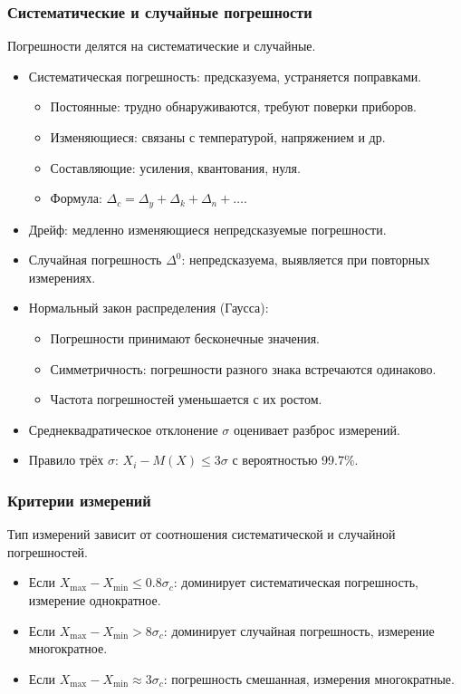 	\subsubsection{Систематические и случайные погрешности}
	Погрешности делятся на систематические и случайные.
	\begin{itemize}
		\item Систематическая погрешность: предсказуема, устраняется поправками.
		\begin{itemize}
			\item Постоянные: трудно обнаруживаются, требуют поверки приборов.
			\item Изменяющиеся: связаны с температурой, напряжением и др.
			\item Составляющие: усиления, квантования, нуля.
			\item Формула: $\Delta_c = \Delta_y + \Delta_k + \Delta_n + \dots$.
		\end{itemize}
		\item Дрейф: медленно изменяющиеся непредсказуемые погрешности.
		\item Случайная погрешность $\Delta^0$: непредсказуема, выявляется при повторных измерениях.
		\item Нормальный закон распределения (Гаусса):
		\begin{itemize}
			\item Погрешности принимают бесконечные значения.
			\item Симметричность: погрешности разного знака встречаются одинаково.
			\item Частота погрешностей уменьшается с их ростом.
		\end{itemize}
		\item Среднеквадратическое отклонение $\sigma$ оценивает разброс измерений.
		\item Правило трёх $\sigma$: $X_i - M(X) \leq 3\sigma$ с вероятностью 99.7\%.
	\end{itemize}
	
	\subsubsection{Критерии измерений}
	Тип измерений зависит от соотношения систематической и случайной погрешностей.
	\begin{itemize}[leftmargin=1.85em]
		\item Если $X_{\text{max}} - X_{\text{min}} \leq 0.8\sigma_c$: доминирует систематическая погрешность, измерение однократное.
		\item Если $X_{\text{max}} - X_{\text{min}} > 8\sigma_c$: доминирует случайная погрешность, измерение многократное.
		\item Если $X_{\text{max}} - X_{\text{min}} \approx 3\sigma_c$: погрешность смешанная, измерения многократные.
	\end{itemize}
	
